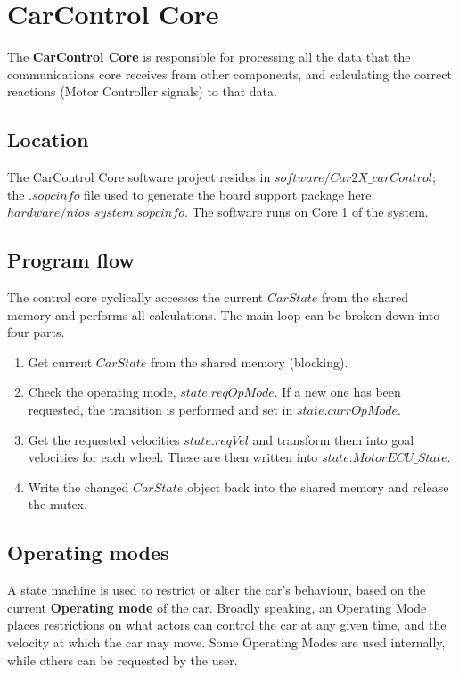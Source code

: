 \section{CarControl Core}
The \textbf{CarControl Core} is responsible for processing all the data that the communications core receives from other components, and calculating the correct reactions (Motor Controller signals) to that data. 

\subsection{Location}
The CarControl Core software project resides in $software/Car2X\_carControl$; the $.sopcinfo$ file used to generate the board support package here: \\$hardware/nios\_system.sopcinfo$. The software runs on Core 1 of the system.

\subsection{Program flow}
The control core cyclically accesses the current $CarState$ from the shared memory and performs all calculations. The main loop can be broken down into four parts.

\begin{enumerate}
\item Get current $CarState$ from the shared memory (blocking).
\item Check the operating mode, $state.reqOpMode$. If a new one has been requested, the transition is performed and set in $state.currOpMode$.
\item Get the requested velocities $state.reqVel$ and transform them into goal velocities for each wheel. These are then written into $state.MotorECU\_State$.
\item Write the changed $CarState$ object back into the shared memory and release the mutex.
\end{enumerate}

\subsection{Operating modes}
A state machine is used to restrict or alter the car's behaviour, based on the current \textbf{Operating mode} of the car. Broadly speaking, an Operating Mode places restrictions on what actors can control the car at any given time, and the velocity at which the car may move. Some Operating Modes are used internally, while others can be requested by the user.

